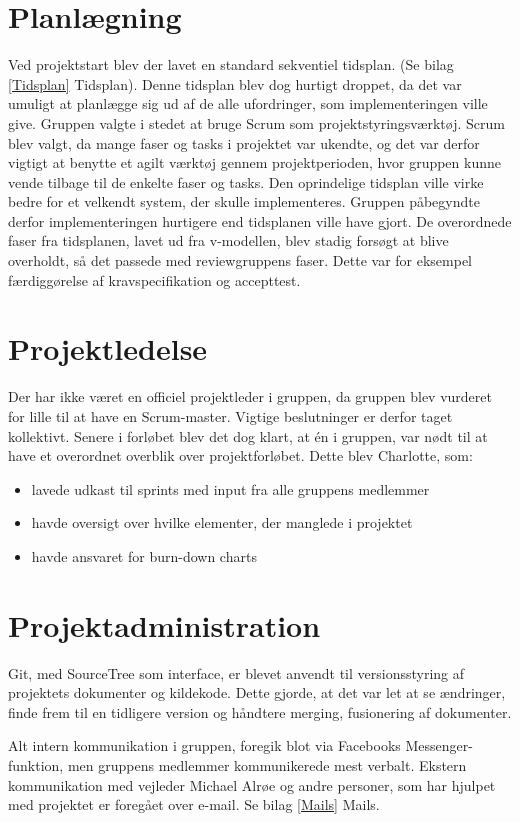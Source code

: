 \section{Planlægning}
Ved projektstart blev der lavet en standard sekventiel tidsplan. (Se bilag \ref{Tidsplan} Tidsplan). Denne tidsplan blev dog hurtigt droppet, da det var umuligt at planlægge sig ud af de alle ufordringer, som implementeringen ville give. Gruppen valgte i stedet at bruge Scrum som projektstyringsværktøj. Scrum blev valgt, da mange faser og tasks i projektet var ukendte, og det var derfor vigtigt at benytte et agilt værktøj gennem projektperioden, hvor gruppen kunne vende tilbage til de enkelte faser og tasks. Den oprindelige tidsplan ville virke bedre for et velkendt system, der skulle implementeres. Gruppen påbegyndte derfor implementeringen hurtigere end tidsplanen ville have gjort. De overordnede faser fra tidsplanen, lavet ud fra v-modellen, blev stadig forsøgt at blive overholdt, så det passede med  reviewgruppens faser. Dette var for eksempel færdiggørelse af kravspecifikation og accepttest. 

\section{Projektledelse}
Der har ikke været en officiel projektleder i gruppen, da gruppen blev vurderet for lille til at have en Scrum-master. Vigtige beslutninger er derfor taget kollektivt. Senere i forløbet blev det dog klart, at én i gruppen, var nødt til at have et overordnet overblik over projektforløbet. Dette blev Charlotte, som: 
\begin{itemize}
\item lavede udkast til sprints  med input fra alle gruppens medlemmer
\item havde oversigt over hvilke elementer, der manglede i projektet
\item havde ansvaret for burn-down charts
\end{itemize} 

\section{Projektadministration}
Git, med SourceTree som interface, er blevet anvendt til versionsstyring af projektets dokumenter og kildekode. Dette gjorde, at det var let at se ændringer, finde frem til en tidligere version og håndtere merging, fusionering af dokumenter.

Alt intern kommunikation i gruppen, foregik blot via Facebooks Messenger-funktion, men gruppens medlemmer kommunikerede mest verbalt. Ekstern kommunikation med vejleder Michael Alrøe og andre personer, som har hjulpet med projektet er foregået over e-mail. Se bilag \ref{Mails} Mails.  

